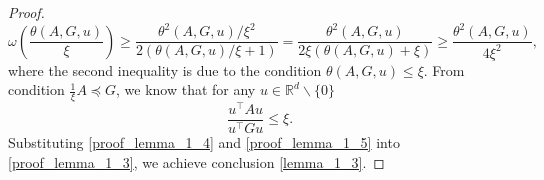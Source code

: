 \documentclass[11pt]{article}
\numberwithin{assumption}{section}
\numberwithin{remark}{section}
\numberwithin{theorem}{section}
\begin{document}
\begin{proof}
\begin{equation}
\omega(\frac{\theta(A, G, u)}{\xi}) \geq \frac{\theta^2(A, G, u)/\xi^2}{2(\theta(A, G, u)/\xi + 1)} = \frac{\theta^2(A, G, u)}{2\xi(\theta(A, G, u) + \xi)} \geq \frac{\theta^2(A, G, u)}{4\xi^2},
\end{equation}
where the second inequality is due to the condition $\theta(A, G, u) \leq \xi$. From condition $\frac{1}{\xi}A \preceq G$, we know that for any $u \in \mathbb{R}^d\backslash\{0\}$
\begin{equation}\label{proof_lemma_1_5}
\frac{u^\top Au}{u^\top Gu} \leq \xi.
\end{equation}
Substituting \eqref{proof_lemma_1_4} and \eqref{proof_lemma_1_5} into \eqref{proof_lemma_1_3}, we achieve conclusion \eqref{lemma_1_3}.

\end{proof}

\end{document}
